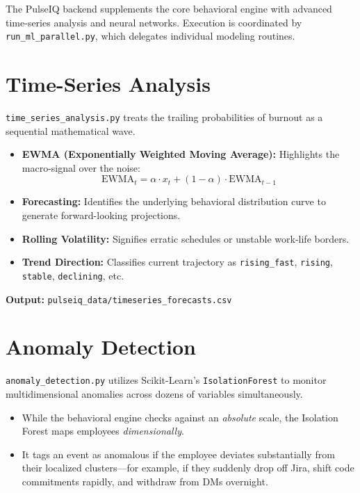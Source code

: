 \documentclass[12pt, a4paper, oneside]{report}
\begin{document}
The PulseIQ backend supplements the core behavioral engine with advanced time-series analysis and neural networks. Execution is coordinated by \texttt{run\_ml\_parallel.py}, which delegates individual modeling routines.

\section{Time-Series Analysis}
\label{sec:timeseries}

\texttt{time\_series\_analysis.py} treats the trailing probabilities of burnout as a sequential mathematical wave.

\begin{itemize}
    \item \textbf{EWMA (Exponentially Weighted Moving Average):} Highlights the macro-signal over the noise:
    \[
        \text{EWMA}_t = \alpha \cdot x_t + (1 - \alpha) \cdot \text{EWMA}_{t-1}
    \]

    \item \textbf{Forecasting:} Identifies the underlying behavioral distribution curve to generate forward-looking projections.

    \item \textbf{Rolling Volatility:} Signifies erratic schedules or unstable work-life borders.

    \item \textbf{Trend Direction:} Classifies current trajectory as \texttt{rising\_fast}, \texttt{rising}, \texttt{stable}, \texttt{declining}, etc.
\end{itemize}

\textbf{Output:} \texttt{pulseiq\_data/timeseries\_forecasts.csv}

\section{Anomaly Detection}
\label{sec:anomaly}

\texttt{anomaly\_detection.py} utilizes Scikit-Learn's \texttt{IsolationForest} to monitor multidimensional anomalies across dozens of variables simultaneously.

\begin{itemize}
    \item While the behavioral engine checks against an \emph{absolute} scale, the Isolation Forest maps employees \emph{dimensionally}.
    \item It tags an event as anomalous if the employee deviates substantially from their localized clusters---for example, if they suddenly drop off Jira, shift code commitments rapidly, and withdraw from DMs overnight.
\end{itemize}
\end{document}
